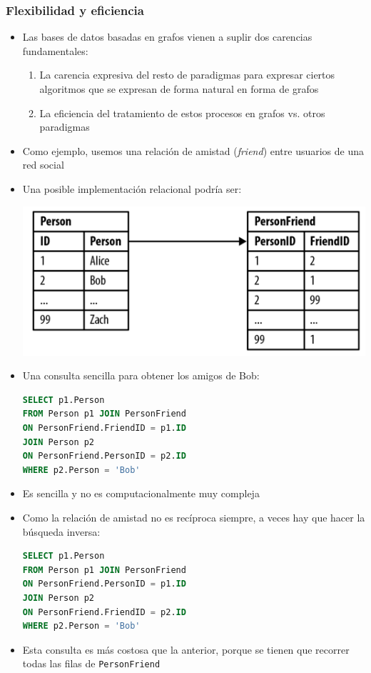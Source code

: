 \documentclass[14pt]{beamer}
\begin{document}
\begin{frame}
\begin{itemize}
\begin{frame}[allowframebreaks]
\end{frame}

\begin{frame}
  \frametitle{Flexibilidad y eficiencia}
\begin{itemize}
\item Las bases de datos basadas en grafos vienen a suplir dos carencias
  fundamentales:
  \begin{enumerate}
  \item La carencia expresiva del resto de paradigmas para expresar ciertos
    algoritmos que se expresan de forma natural en forma de grafos
  \item La eficiencia del tratamiento de estos procesos en grafos vs. otros
    paradigmas
  \end{enumerate}
\item Como ejemplo, usemos una relación de amistad ({\em friend\/}) entre
  usuarios de una red social
\framebreak
\item Una posible implementación relacional podría ser:
  \begin{center}
    \includegraphics[width=.7\textwidth]{img/friends_table}
  \end{center}
\framebreak
\item Una consulta sencilla para obtener los amigos de Bob:
\begin{lstlisting}[language=SQL]
SELECT p1.Person
FROM Person p1 JOIN PersonFriend
ON PersonFriend.FriendID = p1.ID
JOIN Person p2
ON PersonFriend.PersonID = p2.ID
WHERE p2.Person = 'Bob'
\end{lstlisting}
\item Es sencilla y no es computacionalmente muy compleja
\item Como la relación de amistad no es recíproca siempre, a veces hay que
  hacer la búsqueda inversa:
\begin{lstlisting}[language=SQL]
SELECT p1.Person
FROM Person p1 JOIN PersonFriend
ON PersonFriend.PersonID = p1.ID
JOIN Person p2
ON PersonFriend.FriendID = p2.ID
WHERE p2.Person = 'Bob'
\end{lstlisting}
\item Esta consulta es más costosa que la anterior, porque se tienen que
  recorrer todas las filas de {\tt PersonFriend}


\end{itemize}
\end{frame}
\end{itemize}
\end{frame}
\end{document}
